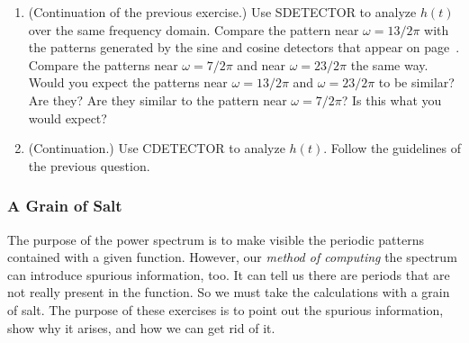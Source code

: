 \begin{enumerate}
  \begin{enumerate}
  \item Graph the power spectrum of $h(t)$ over the frequency domain $0
\leq \omega \leq 4$.  Compare your result with the text.  How many
peaks are there?  Where are they?  How high are they?  Do these
results agree with the amplitude and frequency information provided by
the formula for $h(t)$?


\end{enumerate}
\item (Continuation of the previous exercise.)  Use SDETECTOR to
analyze $h(t)$ over the same frequency domain.  Compare the pattern
near $\omega = 13/2\pi$ with the patterns generated by the sine and
cosine detectors that appear on page~\pageref{cos7t}.  Compare the
patterns near $\omega = 7/2\pi$ and near $\omega = 23/2\pi$ the same
way.  Would you expect the patterns near $\omega = 13/2\pi$ and
$\omega = 23/2\pi$ to be similar?  Are they?  Are they similar to the
pattern near $\omega = 7/2\pi$?  Is this what you would expect?


\item (Continuation.)  Use CDETECTOR to analyze $h(t)$.  Follow the
guidelines of the previous question.


\end{enumerate}
\subsubsection{A Grain of Salt}
\label{subsubsec:a-grain-of-salt}

The purpose of the power spectrum is to make visible the periodic
patterns contained with a given function.  However, our {\em method of
  computing\/} the spectrum can introduce spurious information, too.
It can tell us there are periods that are not really present in the
function.  So we must take the calculations with a grain of salt.  The
purpose of these exercises is to point out the spurious information,
show why it arises, and how we can get rid of it.



